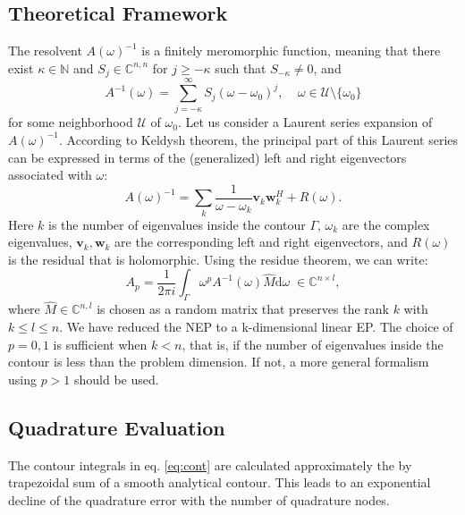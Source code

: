 \documentclass[final,leqno,onefignum,onetabnum]{siamltex1213}
\newcommand{\diff}{\mathrm{d}}
\begin{document}
\subsection{Theoretical Framework}
The resolvent $A(\omega)^{-1}$ is a finitely meromorphic function, meaning that there exist $\kappa\in\mathbb{N}$ and $S_j\in \mathbb{C}^{n,n}$ for $j\geq -\kappa$ such that $S_{-\kappa}\neq 0$, and 
\begin{equation}\label{eq:Ainv}
A^{-1}(\omega)=\sum\limits_{j=-\kappa}^{\infty} S_j (\omega-\omega_0)^j,\;\;
\;\; \omega \in \mathcal{U} \setminus \lbrace\omega_0 \rbrace 
\end{equation}
for some neighborhood $\mathcal{U}$ of $\omega_0$. Let us consider a Laurent series expansion of $A(\omega)^{-1}$. According to Keldysh theorem, \citep{keldysh1951characteristic, beyn_integral_2012} the principal part of this Laurent series can be expressed in terms of the (generalized) left and right eigenvectors associated with $\omega$:
\begin{equation}
\label{eq:Keldysh}
A(\omega)^{-1} = \sum\limits_{k}\frac{1}{\omega-\omega_k}\mathbf{v}_k\mathbf{w}_k^H + R(\omega).
\end{equation}
Here $k$ is the number of eigenvalues inside the contour $\Gamma$, $\omega_k$ are the complex eigenvalues, $\mathbf{v}_k, \mathbf{w}_k$ are the corresponding left and right eigenvectors, and $R(\omega)$ is the residual that is holomorphic. Using the residue theorem, we can write: 
\begin{equation}\label{eq:cont}
A_{p} = \frac{1}{2\pi i}\int_{\Gamma}\omega^p A^{-1}(\omega)\hat{M} \diff\omega \;\in\mathbb{C}^{n \times l},
\end{equation}
where $\hat{M} \in \mathbb{C}^{n,l}$ is chosen as a random matrix that preserves the rank $k$ with $k \leq l \leq n$. We have reduced the NEP to a k-dimensional linear EP. The choice of $p=0,1$ is sufficient when $k<n$, that is, if the number of eigenvalues inside the contour is less than the problem dimension. If not, a more general formalism using $p > 1$ should be used. \citep{beyn_integral_2012}

\subsection{Quadrature Evaluation}
The contour integrals in eq. \ref{eq:cont} are calculated approximately the by trapezoidal sum of a smooth analytical contour. This leads to an exponential decline of the quadrature error with the number of quadrature nodes.
\end{document}
